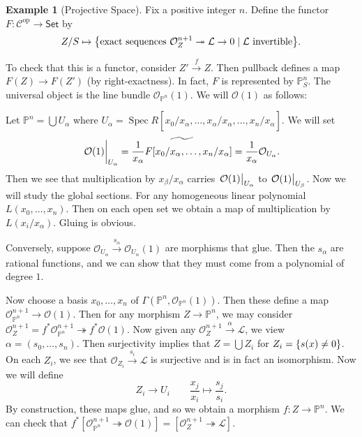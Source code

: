 \documentclass[leqno, openany]{memoir}
\theoremstyle{definition}
\newtheorem{exm}[thm]{Example}
\theoremstyle{remark}
\theoremstyle{plain}
\theoremstyle{definition}
\theoremstyle{remark}
\renewcommand{\P}{\mathbb{P}}
\newcommand{\mc}[1]{\mathcal{#1}}
\newcommand{\mr}[1]{\mathrm{#1}}
\newcommand{\ms}[1]{\mathsf{#1}}
\newcommand{\wt}[1]{\widetilde{#1}}
\newcommand{\wh}[1]{\widehat{#1}}
\DeclareMathOperator{\Spec}{Spec}
\begin{document}
\begin{exm}[Projective Space] Fix a positive integer $n$. Define the functor $F
    \colon \mc{C}^{\mr{op}} \to \ms{Set}$ by \[ Z/S \mapsto \qty{\text{exact
    sequences}\ \mc{O}_Z^{n+1} \twoheadrightarrow \mc{L} \to 0 \mid \mc{L}\
    \text{invertible}}. \]

    To check that this is a functor, consider $Z' \xrightarrow{f} Z$. Then
    pullback defines a map $F(Z) \to F(Z')$ (by right-exactness). In fact, $F$
    is represented by $\P^n_S$. The universal object is the line bundle
    $\mc{O}_{\P^n}(1)$. We will $\mc{O}(1)$ as follows:

    Let $\P^n = \bigcup U_{\alpha}$ where $U_{\alpha} = \Spec R[x_0/x_{\alpha},
    \ldots, \wh{x_{\alpha}/x_{\alpha}}, \ldots, x_n/x_{\alpha}]$. We will set
    \[ \eval{\mc{O}(1)}_{U_{\alpha}} = \wt{\frac{1}{x_{\alpha}}
    F[x_0/x_{\alpha}, \ldots, x_n/x_{\alpha}]} = \frac{1}{x_{\alpha}}
\mc{O}_{U_{\alpha}}. \] Then we see that multiplication by
$x_{\beta}/x_{\alpha}$ carries $\eval{\mc{O}(1)}_{U_{\alpha}}$ to
$\eval{\mc{O}(1)}_{U_{\beta}}$. Now we will study the global sections. For any
homogeneous linear polynomial $L(x_0, \ldots, x_n)$. Then on each open set we
obtain a map of multiplication by $L(x_i/x_{\alpha})$. Gluing is obvious.

    Conversely, suppose $\mc{O}_{U_{\alpha}} \xrightarrow{s_{\alpha}}
    \mc{O}_{U_{\alpha}}(1)$ are morphisms that glue. Then the $s_{\alpha}$ are
    rational functions, and we can show that they must come from a polynomial
    of degree $1$.

    Now choose a basis $x_0, \ldots, x_n$ of $\Gamma(\P^n, \mc{O}_{\P^n}(1))$.
    Then these define a map $\mc{O}_{\P^n}^{n+1} \to \mc{O}(1)$. Then for any
    morphism $Z \to \P^n$, we may consider $\mc{O}_Z^{n+1} = f^*
    \mc{O}_{\P^n}^{n+1} \twoheadrightarrow f^* \mc{O}(1)$. Now given any
    $\mc{O}_Z^{n+1} \xrightarrow{\alpha} \mc{L}$, we view $\alpha = (s_0,
    \ldots, s_n)$. Then surjectivity implies that $Z = \bigcup Z_i$ for $Z_i =
    \qty{s(x) \neq 0}$. On each $Z_i$, we see that $\mc{O}_{Z_i}
    \xrightarrow{s_i} \mc{L}$ is surjective and is in fact an isomorphism. Now
    we will define \[ Z_i \to U_i \qquad \frac{x_j}{x_{i}} \mapsto
    \frac{s_j}{s_i}. \] By construction, these maps glue, and so we obtain a
morphism $f \colon Z \to \P^n$. We can check that $f^* [\mc{O}_{\P^n}^{n+1}
\twoheadrightarrow \mc{O}(1)] = [\mc{O}_Z^{n+1} \twoheadrightarrow \mc{L}]$.
\end{exm}
\end{document}
